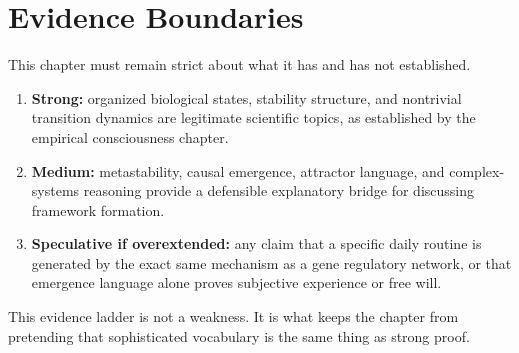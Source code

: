 \section{Evidence Boundaries}

This chapter must remain strict about what it has and has not established.

\begin{enumerate}[nosep]
  \item \textbf{Strong:} organized biological states, stability structure, and
        nontrivial transition dynamics are legitimate scientific topics, as
        established by the empirical consciousness chapter.
  \item \textbf{Medium:} metastability, causal emergence, attractor language,
        and complex-systems reasoning provide a defensible explanatory bridge
        for discussing framework formation.
  \item \textbf{Speculative if overextended:} any claim that a specific daily
        routine is generated by the exact same mechanism as a gene regulatory
        network, or that emergence language alone proves subjective experience
        or free will.
\end{enumerate}

\begin{remark}
This evidence ladder is not a weakness. It is what keeps the chapter from
pretending that sophisticated vocabulary is the same thing as strong proof.
\end{remark}
